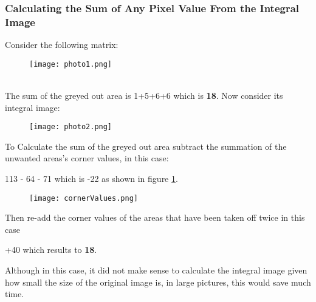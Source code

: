 

            \subsubsection{Calculating the Sum of Any Pixel Value From the Integral Image}
            Consider the following matrix:
            \begin{figure}[ht]
                \texttt{[image: photo1.png]}
                \centering
            \end{figure}
            \\ The sum of the greyed out area is 1+5+6+6 which is
            \textbf{18}. Now consider its integral image:

            \begin{figure}[H]
                \texttt{[image: photo2.png]}
                \centering
            \end{figure}
            To Calculate the sum of the greyed out area subtract the
            summation of the unwanted areas's corner values, in this
            case: 
            \begin{center}
            113 - 64 - 71 which is  -22 as shown in figure
            \ref{cornerValues}.
            \end{center}

            \begin{figure}[H]
                \texttt{[image: cornerValues.png]}
                \centering
                \caption{}
                \label{cornerValues}
            \end{figure}
            Then re-add the corner values of the areas that have been
            taken off twice in this case 
            \begin{center}
            +40 which results to \textbf{18}.
            \end{center}
            Although in this case, it did not make sense to calculate
            the integral image given how small the size of the
            original image is, in large pictures, this would save much
            time. 
    
